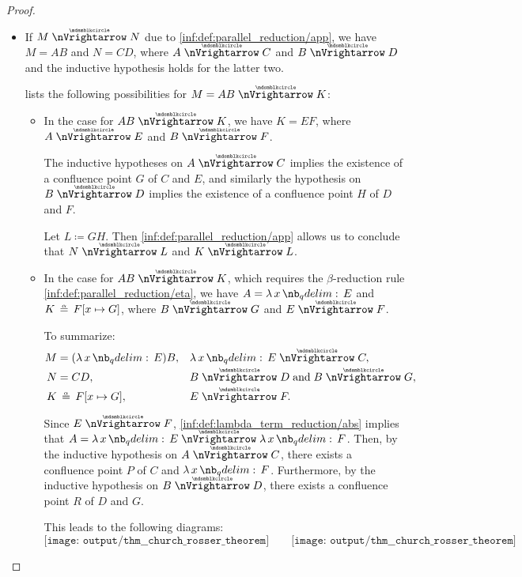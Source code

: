 \begin{proof}
\begin{itemize}
    \item If \( M \ppred N \) due to \ref{inf:def:parallel_reduction/app}, we have \( M = AB \) and \( N = CD \), where \( A \ppred C \) and \( B \ppred D \) and the inductive hypothesis holds for the latter two.

     lists the following possibilities for \( M = AB \ppred K \):
    \begin{itemize}
      \item In the case  for \( AB \ppred K \), we have \( K = EF \), where \( A \ppred E \) and \( B \ppred F \).

      The inductive hypotheses on \( A \ppred C \) implies the existence of a confluence point \( G \) of \( C \) and \( E \), and similarly the hypothesis on \( B \ppred D \) implies the existence of a confluence point \( H \) of \( D \) and \( F \).

      Let \( L \coloneqq GH \). Then \ref{inf:def:parallel_reduction/app} allows us to conclude that \( N \ppred L \) and \( K \ppred L \).

      \item In the case  for \( AB \ppred K \), which requires the \( \beta \)-reduction rule \ref{inf:def:parallel_reduction/eta}, we have \( A = \qabs x E \) and \( K \aequiv F[x \mapsto G] \), where \( B \ppred G \) and \( E \ppred F \).

      To summarize:
      \begin{align*}
        M &= (\qabs x E) B,           &&\qabs x E \ppred C,            \\
        N &= C D,                     &&B \ppred D \T{and} B \ppred G, \\
        K &\aequiv F[x \mapsto G],    &&E \ppred F.
      \end{align*}

      Since \( E \ppred F \), \ref{inf:def:lambda_term_reduction/abs} implies that \( A = \qabs x E \ppred \qabs x F \). Then, by the inductive hypothesis on \( A \ppred C \), there exists a confluence point \( P \) of \( C \) and \( \qabs x F \). Furthermore, by the inductive hypothesis on \( B \ppred D \), there exists a confluence point \( R \) of \( D \) and \( G \).

      This leads to the following diagrams:
      \begin{equation*}
        \texttt{[image: output/thm\_\_church\_rosser\_theorem]}
        \quad\quad
        \texttt{[image: output/thm\_\_church\_rosser\_theorem]}
      \end{equation*}


\end{itemize}
\end{itemize}
\end{proof}

